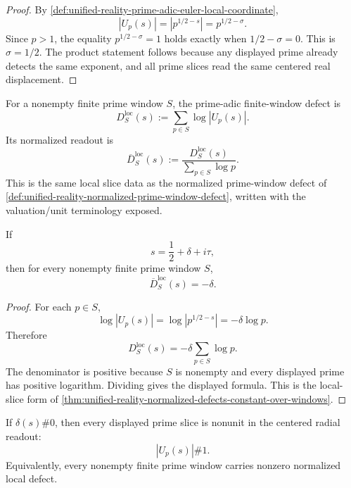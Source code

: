 \begin{proof}
By \autoref{def:unified-reality-prime-adic-euler-local-coordinate},
$$
|U_p(s)|=|p^{1/2-s}|=p^{1/2-\sigma}.
$$
Since $p>1$, the equality $p^{1/2-\sigma}=1$ holds exactly when
$1/2-\sigma=0$.  This is $\sigma=1/2$.  The product statement follows
because any displayed prime already detects the same exponent, and all
prime slices read the same centered real displacement.
\end{proof}

\begin{definition}
\label{def:unified-reality-prime-adic-finite-window-defect}
For a nonempty finite prime window $S$, the prime-adic finite-window
defect is
$$
D_S^{\mathrm{loc}}(s)
:=
\sum_{p\in S}\log |U_p(s)|.
$$
Its normalized readout is
$$
\overline D_S^{\mathrm{loc}}(s)
:=
\frac{D_S^{\mathrm{loc}}(s)}{\sum_{p\in S}\log p}.
$$
This is the same local slice data as the normalized prime-window defect
of \autoref{def:unified-reality-normalized-prime-window-defect}, written
with the valuation/unit terminology exposed.
\end{definition}

\begin{theorem}
\label{thm:unified-reality-prime-adic-slices-read-same-normal-defect}
If
$$
s=\frac12+\delta+i\tau,
$$
then for every nonempty finite prime window $S$,
$$
\overline D_S^{\mathrm{loc}}(s)=-\delta.
$$
\end{theorem}

\begin{proof}
For each $p\in S$,
$$
\log |U_p(s)|
=
\log |p^{1/2-s}|
=
-\delta\log p.
$$
Therefore
$$
D_S^{\mathrm{loc}}(s)
=
-\delta\sum_{p\in S}\log p.
$$
The denominator is positive because $S$ is nonempty and every displayed
prime has positive logarithm.  Dividing gives the displayed formula.  This
is the local-slice form of
\autoref{thm:unified-reality-normalized-defects-constant-over-windows}.
\end{proof}

\begin{corollary}
\label{cor:unified-reality-off-half-locally-nonunit-every-slice}
If $\delta(s)\#0$, then every displayed prime slice is nonunit in the
centered radial readout:
$$
|U_p(s)|\#1.
$$
Equivalently, every nonempty finite prime window carries nonzero
normalized local defect.
\end{corollary}

